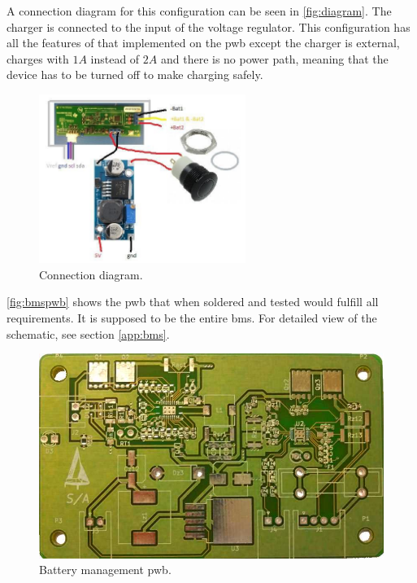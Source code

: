 A connection diagram for this configuration can be seen in \autoref{fig:diagram}. The charger is connected to the input of the voltage regulator. This configuration has all the features of that implemented on the \gls{pwb} except the charger is external, charges with $1A$ instead of $2A$ and there is no power path, meaning that the device has to be turned off to make charging safely.
\begin{figure}[H]
	\centering
	\includegraphics[width=0.6\textwidth]{Figures/diagram.jpg}
	\caption{Connection diagram.}
	\label{fig:diagram}
\end{figure} 

\autoref{fig:bmspwb} shows the \gls{pwb} that when soldered and tested would fulfill all requirements. It is supposed to be the entire \gls{bms}. For detailed view of the schematic, see section \ref{app:bms}.
\begin{figure}[H]
	\centering
	\includegraphics[width=.6\textwidth]{Figures/bmspwb.jpg}
	\caption{Battery management \gls{pwb}.}
	\label{fig:bmspwb}
\end{figure}
